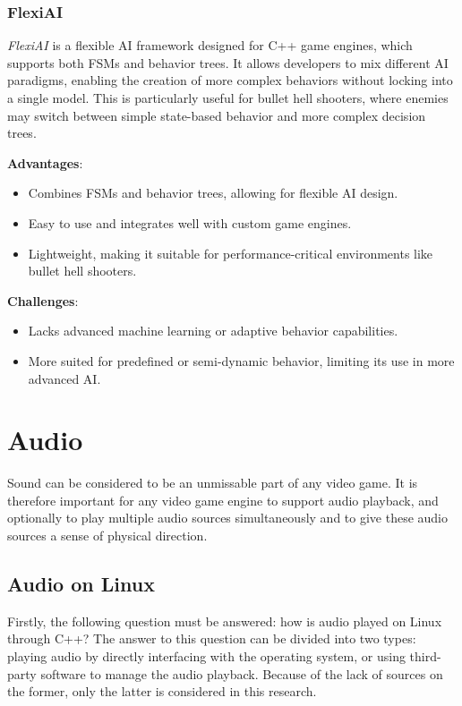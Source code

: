 \documentclass{article} %
\begin{document}
\subsubsection{FlexiAI}

\textit{FlexiAI} is a flexible AI framework designed for C++ game engines, which supports both FSMs and behavior trees. It allows developers to mix different AI paradigms, enabling the creation of more complex behaviors without locking into a single model. This is particularly useful for bullet hell shooters, where enemies may switch between simple state-based behavior and more complex decision trees.

\textbf{Advantages}:
\begin{itemize}
	\item Combines FSMs and behavior trees, allowing for flexible AI design.
	\item Easy to use and integrates well with custom game engines.
	\item Lightweight, making it suitable for performance-critical environments like bullet hell shooters.
\end{itemize}

\textbf{Challenges}:
\begin{itemize}
	\item Lacks advanced machine learning or adaptive behavior capabilities.
	\item More suited for predefined or semi-dynamic behavior, limiting its use in more advanced AI.
\end{itemize}


\section{Audio}
Sound can be considered to be an unmissable part of any video game. It is therefore important for any video game engine to
support audio playback, and optionally to play multiple audio sources simultaneously and to give these audio sources a sense of physical direction.
\subsection{Audio on Linux}
Firstly, the following question must be answered: how is audio played on Linux through C++? The answer to this question can be divided into two types:
playing audio by directly interfacing with the operating system, or using third-party software to manage the audio playback.
Because of the lack of sources on the former, only the latter is considered in this research.
\end{document}
